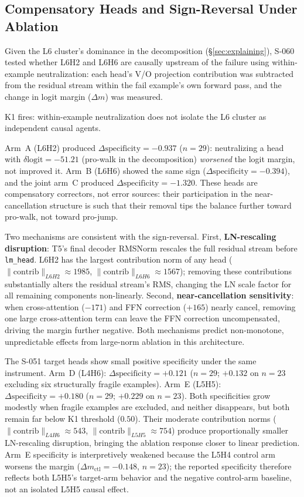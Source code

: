 \subsection{Compensatory Heads and Sign-Reversal Under Ablation}

Given the L6 cluster's dominance in the decomposition (\S\ref{sec:explaining}), S-060
tested whether L6H2 and L6H6 are causally upstream of the failure using within-example
neutralization: each head's V/O projection contribution was subtracted from the
residual stream within the fail example's own forward pass, and the change in logit
margin ($\Delta m$) was measured.

K1 fires: within-example neutralization does not isolate the L6 cluster as independent
causal agents.

Arm~A (L6H2) produced $\Delta\text{specificity}=-0.937$ ($n=29$): neutralizing a head
with $\delta\text{logit}=-51.21$ (pro-walk in the decomposition) \emph{worsened} the
logit margin, not improved it.
Arm~B (L6H6) showed the same sign ($\Delta\text{specificity}=-0.394$), and the joint
arm~C produced $\Delta\text{specificity}=-1.320$.
These heads are compensatory correctors, not error sources: their participation in the
near-cancellation structure is such that their removal tips the balance further toward
pro-walk, not toward pro-jump.

Two mechanisms are consistent with the sign-reversal.
First, \textbf{LN-rescaling disruption}: T5's final decoder RMSNorm rescales the full
residual stream before \texttt{lm\_head}.
L6H2 has the largest contribution norm of any head
($\|\mathrm{contrib}\|_{L6H2}\approx 1985$, $\|\mathrm{contrib}\|_{L6H6}\approx 1567$);
removing these contributions substantially alters the residual stream's RMS, changing
the LN scale factor for all remaining components non-linearly.
Second, \textbf{near-cancellation sensitivity}: when cross-attention ($-171$) and FFN
correction ($+165$) nearly cancel, removing one large cross-attention term can leave
the FFN correction uncompensated, driving the margin further negative.
Both mechanisms predict non-monotone, unpredictable effects from large-norm ablation
in this architecture.

The S-051 target heads show small positive specificity under the same instrument.
Arm~D (L4H6): $\Delta\text{specificity}=+0.121$ ($n=29$; $+0.132$ on $n=23$ excluding
six structurally fragile examples).
Arm~E (L5H5): $\Delta\text{specificity}=+0.180$ ($n=29$; $+0.229$ on $n=23$).
Both specificities grow modestly when fragile examples are excluded, and neither
disappears, but both remain far below K1 threshold ($0.50$).
Their moderate contribution norms ($\|\mathrm{contrib}\|_{L4H6}\approx 543$,
$\|\mathrm{contrib}\|_{L5H5}\approx 754$) produce proportionally smaller LN-rescaling
disruption, bringing the ablation response closer to linear prediction.
Arm~E specificity is interpretively weakened because the L5H4 control arm worsens the
margin ($\Delta m_\text{ctl}=-0.148$, $n=23$); the reported specificity therefore reflects
both L5H5's target-arm behavior and the negative control-arm baseline, not an isolated
L5H5 causal effect.

